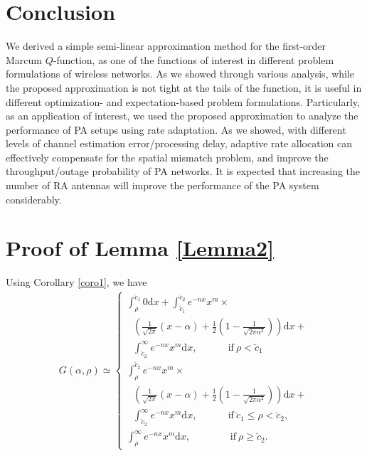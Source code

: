\section{Conclusion}
We derived a simple semi-linear approximation method for the first-order Marcum $Q$-function, as one of the functions of interest in different problem formulations of wireless networks. As we showed through various analysis, while the proposed approximation is not tight at the tails of the function, it is useful in different optimization- and expectation-based problem formulations. Particularly, as an application of interest, we used the proposed approximation to analyze the performance of PA setups using  rate adaptation. As we showed, with different levels of channel estimation error/processing delay, adaptive rate allocation can effectively compensate for the spatial mismatch problem, and improve the throughput/outage probability of PA networks.  It is expected that increasing the number of RA antennas will improve the performance of the PA system considerably.











\appendix
\renewcommand{\thesection}{\Alph{section}}
\section{Proof of Lemma \ref{Lemma2}}
  \label{proof_Lemma2}
Using Corollary \ref{coro1},  we have
\begin{align}
G(\alpha,\rho)\simeq
\begin{cases}
\int_\rho^{\breve{c}_1}0\text{d}x + \int_{\breve{c}_1}^{\breve{c}_2}e^{-nx}x^{m}\times\nonumber\\
~~~\left(\frac{1}{\sqrt{2\pi}}(x-\alpha) + \frac{1}{2}\left(1-\frac{1}{\sqrt{2\pi\alpha^2}}\right)\right)\text{d}x +\nonumber\\
~~~\int_{\breve{c}_2}^{\infty}e^{-nx}x^{m}\text{d}x, ~~~~~~~~~~~~~~\mathrm{if}~  \rho < \breve{c}_1  \\ 
 \int_{\rho}^{\breve{c}_2}e^{-nx}x^{m}\times\nonumber\\
~~~\left(\frac{1}{\sqrt{2\pi}}(x-\alpha) + \frac{1}{2}\left(1-\frac{1}{\sqrt{2\pi\alpha^2}}\right)\right)\text{d}x +\nonumber\\
~~~\int_{\breve{c}_2}^{\infty}e^{-nx}x^{m}\text{d}x, ~~~~~~~~~~~~~~\mathrm{if}~  \breve{c}_1\leq\rho<\breve{c}_2,\nonumber\\
\int_\rho^{\infty} e^{-nx}x^{m}\text{d}x, ~~~~~~~~~~~~~~~~~~\mathrm{if}~  \rho\geq\breve{c}_2.
\end{cases}
\end{align}


